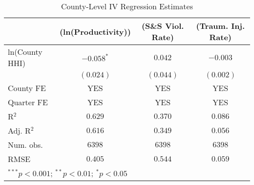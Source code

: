 
\begin{table}
\begin{center}
\begin{tabular}{l c c c}
\hline
 & (ln(Productivity)) & (S\&S Viol. Rate) & (Traum. Inj. Rate) \\
\hline
ln(County HHI) & $-0.058^{*}$ & $0.042$   & $-0.003$  \\
               & $(0.024)$    & $(0.044)$ & $(0.002)$ \\
\hline
County FE      & YES          & YES       & YES       \\
Quarter FE     & YES          & YES       & YES       \\
R$^2$          & $0.629$      & $0.370$   & $0.086$   \\
Adj. R$^2$     & $0.616$      & $0.349$   & $0.056$   \\
Num. obs.      & $6398$       & $6398$    & $6398$    \\
RMSE           & $0.405$      & $0.544$   & $0.059$   \\
\hline
\multicolumn{4}{l}{\scriptsize{$^{***}p<0.001$; $^{**}p<0.01$; $^{*}p<0.05$}}
\end{tabular}
\caption{County-Level IV Regression Estimates}
\label{iv_table}
\end{center}
\end{table}

